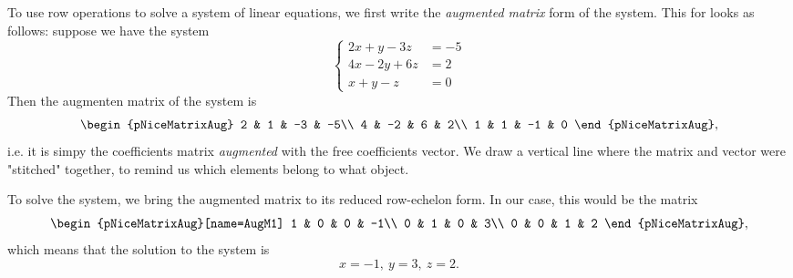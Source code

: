 To use row operations to solve a system of linear equations, we first write the \emph{augmented matrix} form of the system. This for looks as follows: suppose we have the system
\[
	\begin{cases}
		2x+y-3z  &= -5\\
		4x-2y+6z &=  2\\
		x+y-z    &=  0
	\end{cases}
\]
Then the augmenten matrix of the system is
\[
	\begin{pNiceMatrixAug}
		2 &  1 & -3 & -5\\
		4 & -2 &  6 &  2\\
		1 &  1 & -1 &  0
	\end{pNiceMatrixAug},
\]
i.e. it is simpy the coefficients matrix \textit{augmented} with the free coefficients vector. We draw a vertical line where the matrix and vector were "stitched" together, to remind us which elements belong to what object.

To solve the system, we bring the augmented matrix to its reduced row-echelon form. In our case, this would be the matrix
\[
	\begin{pNiceMatrixAug}[name=AugM1]
		1 & 0 & 0 & -1\\
		0 & 1 & 0 &  3\\
		0 & 0 & 1 &  2
	\end{pNiceMatrixAug},
\]
which means that the solution to the system is
\[
	x=-1,\ y=3,\ z=2.
\]
